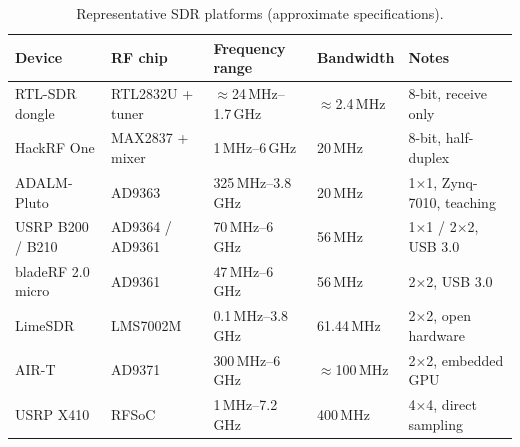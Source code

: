 \begin{table}[htbp]\centering\small
\caption{Representative SDR platforms (approximate specifications).}
\label{tab:ch07:platforms}
\setlength{\tabcolsep}{4pt}\footnotesize
\begin{tabular}{lllll}
\toprule
Device & RF chip & Frequency range & Bandwidth & Notes \\
\midrule
RTL-SDR dongle & RTL2832U + tuner & $\approx$24\,MHz--1.7\,GHz & $\approx$2.4\,MHz & 8-bit, receive only \\
HackRF One & MAX2837 + mixer & 1\,MHz--6\,GHz & 20\,MHz & 8-bit, half-duplex \\
ADALM-Pluto & AD9363 & 325\,MHz--3.8\,GHz & 20\,MHz & 1$\times$1, Zynq-7010, teaching \\
USRP B200 / B210 & AD9364 / AD9361 & 70\,MHz--6\,GHz & 56\,MHz & 1$\times$1 / 2$\times$2, USB 3.0 \\
bladeRF 2.0 micro & AD9361 & 47\,MHz--6\,GHz & 56\,MHz & 2$\times$2, USB 3.0 \\
LimeSDR & LMS7002M & 0.1\,MHz--3.8\,GHz & 61.44\,MHz & 2$\times$2, open hardware \\
AIR-T & AD9371 & 300\,MHz--6\,GHz & $\approx$100\,MHz & 2$\times$2, embedded GPU \\
USRP X410 & RFSoC & 1\,MHz--7.2\,GHz & 400\,MHz & 4$\times$4, direct sampling \\
\bottomrule
\end{tabular}
\end{table}


